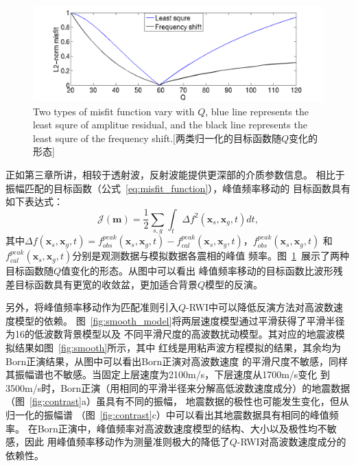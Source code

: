 \begin{figure}[!htbp]
    \centering
    {\includegraphics[width=0.92\linewidth]{figure/misfit_com}}
	{Two types of misfit function vary with $Q$, blue line represents the least 
	squre of amplitue residual, and the black line represents the least squre of 
	the frequency shift.}[两类归一化的目标函数随$Q$变化的形态]
    \label{fig:misfit_com}
\end{figure}
正如第三章所讲，相较于透射波，反射波能提供更深部的介质参数信息。
相比于振幅匹配的目标函数（公式~\ref{eq:misfit_function}），峰值频率移动的
目标函数具有如下表达式：
\begin{equation}
    \mathcal{J}(\mathbf{m})=\frac{1}{2}\sum_{s,g}\int_t\Delta f^2(\mathbf{x}_s,\mathbf{x}_g,t)dt,
    \label{eq:freq_misfit_function}
\end{equation}
其中$\Delta f(\mathbf{x}_s,\mathbf{x}_g,t)=f^{peak}_{obs}(\mathbf{x}_s,\mathbf{x}_g,t)-
f^{peak}_{cal}(\mathbf{x}_s,\mathbf{x}_g,t)$，$f^{peak}_{obs}(\mathbf{x}_s,\mathbf{x}_g,t)$
和$f^{peak}_{cal}(\mathbf{x}_s,\mathbf{x}_g,t)$分别是观测数据与模拟数据各震相的峰值
频率。图~\ref{fig:misfit_com}~展示了两种目标函数随$Q$值变化的形态。从图中可以看出
峰值频率移动的目标函数比波形残差目标函数具有更宽的收敛盆，更加适合背景$Q$模型的反演。

另外，将峰值频率移动作为匹配准则引入$Q$-RWI中可以降低反演方法对高波数速度模型的依赖。
图~\ref{fig:smooth_model}将两层速度模型通过平滑获得了平滑半径为16的低波数背景模型以及
不同平滑尺度的高波数扰动模型。其对应的地震波模拟结果如图~\ref{fig:smooth}所示，其中
红线是用粘声波方程模拟的结果，其余均为Born正演结果，从图中可以看出Born正演对高波数速度
的平滑尺度不敏感，同样其振幅谱也不敏感。当固定上层速度为2100m/s，下层速度从1700m/s变化
到3500m/s时，Born正演（用相同的平滑半径来分解高低波数速度成分）的地震数据
（图~\ref{fig:contrast}a）虽具有不同的振幅，
地震数据的极性也可能发生变化，但从归一化的振幅谱
（图~\ref{fig:contrast}c）中可以看出其地震数据具有相同的峰值频率。
在Born正演中，峰值频率对高波数速度模型的结构、大小以及极性均不敏感，因此
用峰值频率移动作为测量准则极大的降低了$Q$-RWI对高波数速度成分的依赖性。


